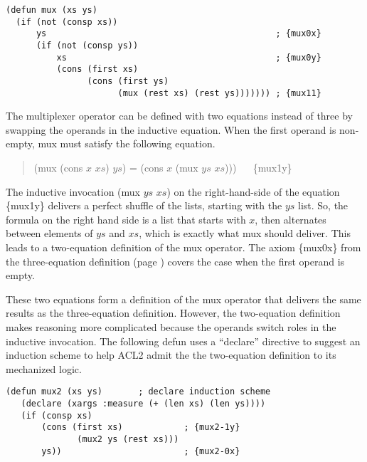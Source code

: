\label{mux-defun}
\begin{Verbatim}
(defun mux (xs ys)
  (if (not (consp xs))
      ys                                             ; {mux0x}
      (if (not (consp ys))
          xs                                         ; {mux0y}
          (cons (first xs)
                (cons (first ys)
                      (mux (rest xs) (rest ys))))))) ; {mux11}
\end{Verbatim}

\begin{aside}
The multiplexer operator can be defined with two equations instead of three
by swapping the operands in the inductive equation.
When the first operand is non-empty, mux must satisfy the following equation.
\begin{quote}
(mux (cons $x$ $xs$) $ys$) = (cons $x$ (mux $ys$ $xs$))) ~~ \{mux1y\}
\end{quote}

The inductive invocation (mux $ys$ $xs$)
on the right-hand-side of the equation \{mux1y\}
delivers a perfect shuffle of the lists,
starting with the $ys$ list.
So, the formula on the right hand side is a list that starts with $x$,
then alternates between elements of $ys$ and $xs$, which is exactly what
mux should deliver. This leads to a two-equation definition of the mux operator.
The axiom \{mux0x\} from the three-equation definition
(page \pageref{def:mux})
covers the case when the first operand is empty.

These two equations form a definition of the mux operator
that delivers the same results as the three-equation definition.
However, the two-equation definition makes reasoning more complicated
because the operands switch roles in the inductive invocation.
The following defun uses a ``declare'' directive to suggest
an induction scheme to help ACL2 admit
the the two-equation definition to its mechanized logic.

\label{mux-2eq-defun}
\begin{Verbatim}
(defun mux2 (xs ys)       ; declare induction scheme
   (declare (xargs :measure (+ (len xs) (len ys))))
   (if (consp xs)
       (cons (first xs)            ; {mux2-1y}
              (mux2 ys (rest xs)))
       ys))                        ; {mux2-0x}
\end{Verbatim}
\caption{Defining mux with Two Equations}
\label{aside:mux-2eq}
\end{aside}

